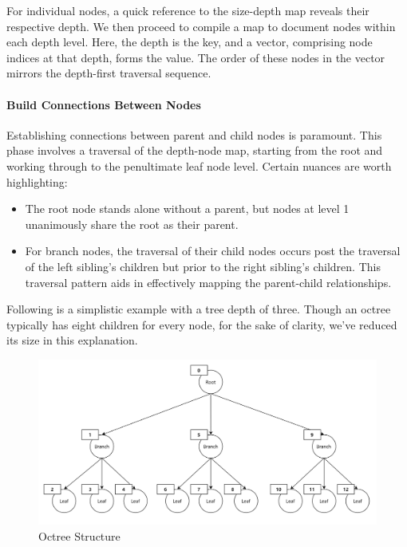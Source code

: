 \documentclass[11pt, a4paper,oneside,chapterprefix=false]{scrbook}
\begin{document}
For individual nodes, a quick reference to the size-depth map reveals their respective depth. We then proceed to compile a map to document nodes within each depth level. Here, the depth is the key, and a vector, comprising node indices at that depth, forms the value. The order of these nodes in the vector mirrors the depth-first traversal sequence.

\paragraph{Build Connections Between Nodes}

Establishing connections between parent and child nodes is paramount. This phase involves a traversal of the depth-node map, starting from the root and working through to the penultimate leaf node level. Certain nuances are worth highlighting:

\begin{itemize}
	\item The root node stands alone without a parent, but nodes at level 1 unanimously share the root as their parent.
	\item For branch nodes, the traversal of their child nodes occurs post the traversal of the left sibling's children but prior to the right sibling's children. This traversal pattern aids in effectively mapping the parent-child relationships.
\end{itemize}

Following is a simplistic example with a tree depth of three. Though an octree typically has eight children for every node, for the sake of clarity, we've reduced its size in this explanation. 

\begin{figure}[H]
    \centering
    \includegraphics*[width=1.0\textwidth]{figures/octree.png}
    \caption{Octree Structure}
    \label{fig:octree structure}
\end{figure}
\end{document}
